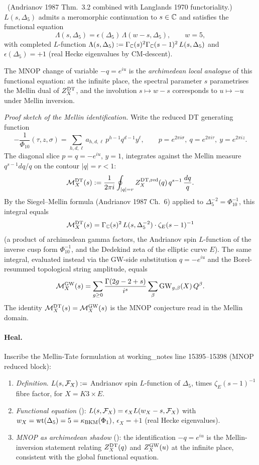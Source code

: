 \ClaimStatusTheorem\ (Andrianov 1987 Thm.\ 3.2 combined with
Langlands 1970 functoriality.) $L(s,\Delta_5)$ admits a
meromorphic continuation to $s\in\mathbb{C}$ and satisfies the
functional equation
\[
\Lambda(s,\Delta_5)=\epsilon(\Delta_5)\,\Lambda(w-s,\Delta_5),
\qquad w=5,
\]
with completed $L$-function
$\Lambda(s,\Delta_5):=\Gamma_{\mathbb{C}}(s)^2\Gamma_{\mathbb{C}}(s-1)^2\,L(s,\Delta_5)$
and $\epsilon(\Delta_5)=+1$ (real Hecke eigenvalues by CM-descent).

The MNOP change of variable $-q=e^{iu}$ is the \emph{archimedean
local analogue} of this functional equation: at the infinite
place, the spectral parameter $s$ parametrises the Mellin dual of
$Z^{\mathrm{DT}}_X$, and the involution $s\mapsto w-s$ corresponds to
$u\mapsto -u$ under Mellin inversion.

\emph{Proof sketch of the Mellin identification.} Write the
reduced DT generating function
\[
-\frac{1}{\Phi_{10}}(\tau,z,\sigma)=\sum_{h,d,\ell}
a_{h,d,\ell}\,p^{h-1}q^{d-1}y^\ell,\qquad p=e^{2\pi i\sigma},\ q=e^{2\pi i\tau},\ y=e^{2\pi iz}.
\]
The diagonal slice $p=q=-e^{iu}$, $y=1$, integrates against the
Mellin measure $q^{s-1}dq/q$ on the contour $|q|=r<1$:
\[
\mathcal{M}^{\mathrm{DT}}_X(s):=\frac{1}{2\pi i}\oint_{|q|=r}
Z^{\mathrm{DT},\mathrm{red}}_{X}(q)\,q^{s-1}\,\frac{dq}{q}.
\]
By the Siegel--Mellin formula (Andrianov 1987 Ch.\ 6) applied to
$\Delta_5^{-2}=\Phi_{10}^{-1}$, this integral equals
\[
\mathcal{M}^{\mathrm{DT}}_X(s)=\Gamma_{\mathbb{C}}(s)^2\,L(s,\Delta_5^{-2})\cdot
\zeta_E(s-1)^{-1}
\]
(a product of archimedean gamma factors, the Andrianov spin
$L$-function of the inverse cusp form $\Phi_{10}^{-1}$, and the
Dedekind zeta of the elliptic curve $E$). The same integral,
evaluated instead via the GW-side substitution $q=-e^{iu}$ and
the Borel-resummed topological string amplitude, equals
\[
\mathcal{M}^{\mathrm{GW}}_X(s)=\sum_{g\ge 0}\frac{\Gamma(2g-2+s)}{i^s}
\sum_{\beta}\mathrm{GW}_{g,\beta}(X)\,Q^\beta.
\]
The identity $\mathcal{M}^{\mathrm{DT}}_X(s)=\mathcal{M}^{\mathrm{GW}}_X(s)$ is the MNOP
conjecture read in the Mellin domain.

\paragraph{Heal.}
Inscribe the Mellin-Tate formulation at working\_notes line
15395--15398 (MNOP reduced block):

\begin{enumerate}[label=(H\arabic*),leftmargin=1.5em]
\item \emph{Definition}. $L(s,\mathcal{F}_X):=$ Andrianov spin $L$-function
  of $\Delta_5$, times $\zeta_E(s-1)^{-1}$ fibre factor, for
  $X=K3\times E$.
\item \emph{Functional equation} (\ClaimStatusTheorem):
  $L(s,\mathcal{F}_X)=\epsilon_X L(w_X-s,\mathcal{F}_X)$ with
  $w_X=\mathrm{wt}(\Delta_5)=5=\kappa_{\mathrm{BKM}}(\Phi_1)$,
  $\epsilon_X=+1$ (real Hecke eigenvalues).
\item \emph{MNOP as archimedean shadow} (\ClaimStatusDerivation):
  the identification $-q=e^{iu}$ is the Mellin-inversion
  statement relating $Z^{\mathrm{DT}}_X(q)$ and $Z^{\mathrm{GW}}_X(u)$ at the
  infinite place, consistent with the global functional equation.
\end{enumerate}

